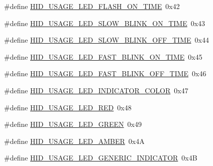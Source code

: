 \begin{DoxyCompactItemize}
\item 
\#define \hyperlink{group__USBD__HID_gad942590ef85818bacfbaa0655e0ed269}{H\+I\+D\+\_\+\+U\+S\+A\+G\+E\+\_\+\+L\+E\+D\+\_\+\+F\+L\+A\+S\+H\+\_\+\+O\+N\+\_\+\+T\+I\+ME}~0x42
\item 
\#define \hyperlink{group__USBD__HID_gad36a76b56e9907632d47d5c41fb9532a}{H\+I\+D\+\_\+\+U\+S\+A\+G\+E\+\_\+\+L\+E\+D\+\_\+\+S\+L\+O\+W\+\_\+\+B\+L\+I\+N\+K\+\_\+\+O\+N\+\_\+\+T\+I\+ME}~0x43
\item 
\#define \hyperlink{group__USBD__HID_ga3a9ec4aee050a3345dab774f559f06b6}{H\+I\+D\+\_\+\+U\+S\+A\+G\+E\+\_\+\+L\+E\+D\+\_\+\+S\+L\+O\+W\+\_\+\+B\+L\+I\+N\+K\+\_\+\+O\+F\+F\+\_\+\+T\+I\+ME}~0x44
\item 
\#define \hyperlink{group__USBD__HID_ga29edc17f7621d8e8ae6784719a8fc0d3}{H\+I\+D\+\_\+\+U\+S\+A\+G\+E\+\_\+\+L\+E\+D\+\_\+\+F\+A\+S\+T\+\_\+\+B\+L\+I\+N\+K\+\_\+\+O\+N\+\_\+\+T\+I\+ME}~0x45
\item 
\#define \hyperlink{group__USBD__HID_gabe40d382c5e3c869915e538ccfc41852}{H\+I\+D\+\_\+\+U\+S\+A\+G\+E\+\_\+\+L\+E\+D\+\_\+\+F\+A\+S\+T\+\_\+\+B\+L\+I\+N\+K\+\_\+\+O\+F\+F\+\_\+\+T\+I\+ME}~0x46
\item 
\#define \hyperlink{group__USBD__HID_gadb3da176f60220a7a4e144951a9d3f04}{H\+I\+D\+\_\+\+U\+S\+A\+G\+E\+\_\+\+L\+E\+D\+\_\+\+I\+N\+D\+I\+C\+A\+T\+O\+R\+\_\+\+C\+O\+L\+OR}~0x47
\item 
\#define \hyperlink{group__USBD__HID_ga780c86a3c9ba4067b65eb433ac1f8969}{H\+I\+D\+\_\+\+U\+S\+A\+G\+E\+\_\+\+L\+E\+D\+\_\+\+R\+ED}~0x48
\item 
\#define \hyperlink{group__USBD__HID_gaf8c1b2eabce7c6de2d1ac4a42e0ff14e}{H\+I\+D\+\_\+\+U\+S\+A\+G\+E\+\_\+\+L\+E\+D\+\_\+\+G\+R\+E\+EN}~0x49
\item 
\#define \hyperlink{group__USBD__HID_gafaf2aa31520e8770dccaa59823f8f991}{H\+I\+D\+\_\+\+U\+S\+A\+G\+E\+\_\+\+L\+E\+D\+\_\+\+A\+M\+B\+ER}~0x4A
\item 
\#define \hyperlink{group__USBD__HID_ga143b6421daaa592826a0e79f01d807a5}{H\+I\+D\+\_\+\+U\+S\+A\+G\+E\+\_\+\+L\+E\+D\+\_\+\+G\+E\+N\+E\+R\+I\+C\+\_\+\+I\+N\+D\+I\+C\+A\+T\+OR}~0x4B
\end{DoxyCompactItemize}

